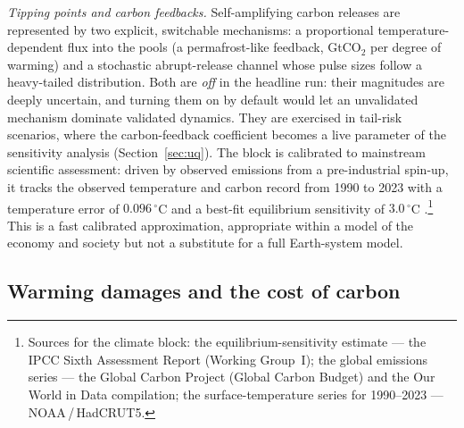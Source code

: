 \documentclass[a4paper,fleqn]{cas-sc}
\newcommand{\response}[1]{\medskip\noindent\textcolor{blue}{\small\itshape [Addressed: #1]}\medskip}
\begin{document}
\emph{Tipping points and carbon feedbacks.} Self-amplifying carbon releases are represented by two
explicit, switchable mechanisms: a proportional temperature-dependent flux into the pools (a
permafrost-like feedback, GtCO$_2$ per degree of warming) and a stochastic abrupt-release channel
whose pulse sizes follow a heavy-tailed distribution. Both are \emph{off} in the headline run:
their magnitudes are deeply uncertain, and turning them on by default would let an unvalidated
mechanism dominate validated dynamics. They are exercised in tail-risk scenarios, where the
carbon-feedback coefficient becomes a live parameter of the sensitivity analysis
(Section~\ref{sec:uq}). The block is calibrated to mainstream scientific assessment: driven by observed emissions from a
pre-industrial spin-up, it tracks the observed temperature and carbon record from 1990 to 2023
with a temperature error of $0.096\,^\circ$C and a best-fit equilibrium sensitivity of
$3.0\,^\circ$C \citep{ipcc_ar6_wg1,friedlingstein2023}.\footnote{Sources for the climate block: the
equilibrium-sensitivity estimate --- the IPCC Sixth Assessment Report (Working Group~I); the global
emissions series --- the Global Carbon Project (Global Carbon Budget) and the Our World in Data
compilation; the surface-temperature series for 1990--2023 --- NOAA\,/\,HadCRUT5.} This is a fast
calibrated approximation, appropriate within a model of the economy and society but not a substitute
for a full Earth-system model.

\subsection{Warming damages and the cost of carbon}

\end{document}
